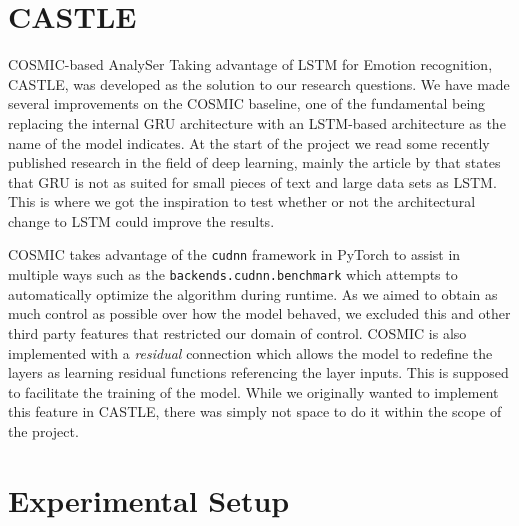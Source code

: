 \documentclass[nofilelist]{cslthse-msc}
\begin{document}
\section{CASTLE}

COSMIC-based AnalySer Taking advantage of LSTM for Emotion recognition, CASTLE, was developed as the solution to our research questions. We have made several improvements on the COSMIC baseline, one of the fundamental being replacing the internal GRU architecture with an LSTM-based architecture as the name of the model indicates. 
At the start of the project we read some recently published research in the field of deep learning, mainly the article by \citet{edseee.922172720200601} that states that GRU is not as suited for small pieces of text and large data sets as LSTM. This is where we got the inspiration to test whether or not the architectural change to LSTM could improve the results. 




COSMIC takes advantage of the \texttt{cudnn} framework in PyTorch to assist in multiple ways such as the \texttt{backends.cudnn.benchmark} which attempts to automatically optimize the algorithm during runtime. As we aimed to obtain as much control as possible over how the model behaved, we excluded this and other third party features that restricted our domain of control.  
COSMIC is also implemented with a \textit{residual} connection \citep{he2015deep} which allows the model to redefine the layers as learning residual functions referencing the layer inputs. This is supposed to facilitate the training of the model. While we originally wanted to implement this feature in CASTLE, there was simply not space to do it within the scope of the project. 










\section{Experimental Setup}

\end{document}
